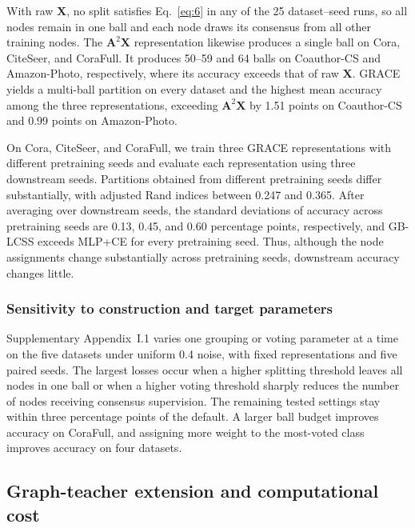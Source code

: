 \documentclass[times,review,10pt]{elsarticle}
\theoremstyle{definition}
\theoremstyle{plain}
\begin{document}


With raw \(\mathbf{X}\), no split satisfies Eq.~\eqref{eq:6} in any of the 25 dataset--seed runs, so all nodes remain in one ball and each node draws its consensus from all other training nodes. The \(\mathbf{A}^2\mathbf{X}\) representation likewise produces a single ball on Cora, CiteSeer, and CoraFull. It produces 50--59 and 64 balls on Coauthor-CS and Amazon-Photo, respectively, where its accuracy exceeds that of raw \(\mathbf{X}\). GRACE yields a multi-ball partition on every dataset and the highest mean accuracy among the three representations, exceeding \(\mathbf{A}^2\mathbf{X}\) by 1.51 points on Coauthor-CS and 0.99 points on Amazon-Photo. 

On Cora, CiteSeer, and CoraFull, we train three GRACE representations with different pretraining seeds and evaluate each representation using three downstream seeds. Partitions obtained from different pretraining seeds differ substantially, with adjusted Rand indices \cite{ref74} between 0.247 and 0.365. After averaging over downstream seeds, the standard deviations of accuracy across pretraining seeds are 0.13, 0.45, and 0.60 percentage points, respectively, and GB-LCSS exceeds MLP+CE for every pretraining seed. Thus, although the node assignments change substantially across pretraining seeds, downstream accuracy changes little.

\subsubsection{Sensitivity to construction and target parameters}\label{sec:4.3.4}

Supplementary Appendix~I.1 varies one grouping or voting parameter at a time on the five datasets under uniform 0.4 noise, with fixed representations and five paired seeds. The largest losses occur when a higher splitting threshold leaves all nodes in one ball or when a higher voting threshold sharply reduces the number of nodes receiving consensus supervision. The remaining tested settings stay within three percentage points of the default. A larger ball budget improves accuracy on CoraFull, and assigning more weight to the most-voted class improves accuracy on four datasets.

\subsection{Graph-teacher extension and computational cost}\label{sec:4.4}
\end{document}
